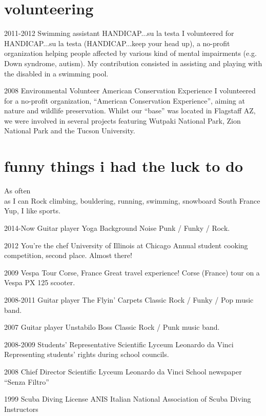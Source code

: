 \documentclass[]{friggeri-cv} %
\begin{document}
\section{volunteering}
\begin{entrylist}
\entry
{2011-2012}
{Swimming assistant}
{HANDICAP...su la testa}
{
    I volunteered for HANDICAP...su la testa (HANDICAP...keep your head up), a no-profit
    organization helping people affected by various kind of mental impairments (e.g. Down syndrome, autism). My contribution consisted in assisting and playing with the disabled in a swimming pool.
}

\entry
{2008}
{Environmental Volunteer}
{American Conservation Experience}
{
    I volunteered for a no-profit organization, ``American Conservation Experience'', aiming at nature
    and wildlife preservation. Whilst our ``base'' was located in Flagstaff AZ, we were involved in
    several projects featuring Wutpaki National Park, Zion National Park and the Tucson University.
}
\end{entrylist}

\newpage
\section{funny things i had the luck to do}
\begin{entrylist}
\entry
{As often\\as I can}
{Rock climbing, bouldering, running, swimming, snowboard}
{South France}
{Yup, I like sports.}

\entry
{2014-Now}
{Guitar player}
{Yoga Background Noise}
{Punk / Funky / Rock.}

\entry
{2012}
{You're the chef}
{University of Illinois at Chicago}
{Annual student cooking competition, second place. Almost there!}

\entry
{2009}
{Vespa Tour}
{Corse, France}
{Great travel experience! Corse (France) tour on a Vespa PX 125 scooter.}

\entry
{2008-2011}
{Guitar player}
{The Flyin' Carpets}
{Classic Rock / Funky / Pop music band.}

\entry
{2007}
{Guitar player}
{Unstabilo Boss}
{Classic Rock / Punk music band.}

\entry
{2008-2009}
{Students' Representative}
{Scientific Lyceum Leonardo da Vinci}
{Representing students' rights during school councils.}

\entry
{2008}
{Chief Director}
{Scientific Lyceum Leonardo da Vinci}
{School newspaper ``Senza Filtro''}

\entry
{1999}
{Scuba Diving License}
{ANIS}
{Italian National Association of Scuba Diving Instructors}
\end{entrylist}
\end{document}
